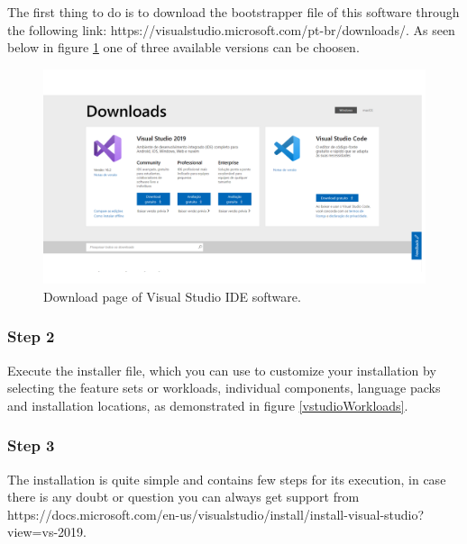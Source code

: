 \begin{refsection}
	The first thing to do is to download the bootstrapper file of this software through the following link: https://visualstudio.microsoft.com/pt-br/downloads/. As seen below in figure \ref{vstudio} one of three available versions can be choosen.
	
	\begin{figure}[H]
		\centering
		\includegraphics[width=1\linewidth]{./sdf/arduino_quantum_rx/figures/vsDownload.pdf}
		\caption{Download page of Visual Studio IDE software.}
		\label{vstudio}
	\end{figure}
	
	
	\subsubsection{Step 2}
	
	Execute the installer file, which you can use to customize your installation by selecting the feature sets or workloads, individual components, language packs and installation locations, as demonstrated in figure \ref{vstudioWorkloads}.
	
	
	
	\subsubsection{Step 3}
	
	The installation is quite simple and contains few steps for its execution, in case there is any doubt or question you can always get support from https://docs.microsoft.com/en-us/visualstudio/install/install-visual-studio?view=vs-2019.
	

\end{refsection}
